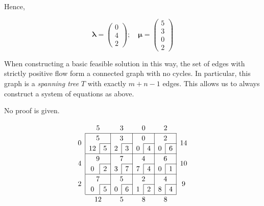 \noindent Hence,

\[
	\bm\lambda = \begin{pmatrix}
		0 \\ 4 \\ 2
	\end{pmatrix};\quad \bm\mu = \begin{pmatrix}
		5 \\3\\0\\2
	\end{pmatrix}
\]

\begin{theorem}
	When constructing a basic feasible solution in this way, the set of edges with strictly positive flow form a connected graph with no cycles.
	In particular, this graph is a \textit{spanning tree} \( T \) with exactly \( m + n - 1 \) edges.
	This allows us to always construct a system of equations as above.
\end{theorem}
\noindent No proof is given.

\[
	\arraycolsep=5pt\def\arraystretch{1.2}
	\begin{array}{c|c|c|c|c|c|c|c|c|c}
		\multicolumn{1}{c}{}   & \multicolumn{2}{c}{5}   & \multicolumn{2}{c}{3}  & \multicolumn{2}{c}{0}  & \multicolumn{2}{c}{2}  & \multicolumn{1}{c}{}                                       \\\cline{2-9}
		\multirow{2}{*}{\(0\)} & \multicolumn{2}{c|}{5}  & \multicolumn{2}{c|}{3} & \multicolumn{2}{c|}{0} & \multicolumn{2}{c|}{2} & \multirow{2}{*}{\(14\)}                                    \\\cline{3-3}\cline{5-5}\cline{7-7}\cline{9-9}
		                       & \multicolumn{1}{c|}{12} & 5                      & \multicolumn{1}{c|}{2} & 3                      & \multicolumn{1}{c|}{0}  & 4 & \multicolumn{1}{c|}{0} & 6 & \\\cline{2-9}
		\multirow{2}{*}{\(4\)} & \multicolumn{2}{c|}{9}  & \multicolumn{2}{c|}{7} & \multicolumn{2}{c|}{4} & \multicolumn{2}{c|}{6} & \multirow{2}{*}{\(10\)}                                    \\\cline{3-3}\cline{5-5}\cline{7-7}\cline{9-9}
		                       & \multicolumn{1}{c|}{0}  & 2                      & \multicolumn{1}{c|}{3} & 7                      & \multicolumn{1}{c|}{7}  & 4 & \multicolumn{1}{c|}{0} & 1 & \\\cline{2-9}
		\multirow{2}{*}{\(2\)} & \multicolumn{2}{c|}{7}  & \multicolumn{2}{c|}{5} & \multicolumn{2}{c|}{2} & \multicolumn{2}{c|}{4} & \multirow{2}{*}{\(9\)}                                     \\\cline{3-3}\cline{5-5}\cline{7-7}\cline{9-9}
		                       & \multicolumn{1}{c|}{0}  & 5                      & \multicolumn{1}{c|}{0} & 6                      & \multicolumn{1}{c|}{1}  & 2 & \multicolumn{1}{c|}{8} & 4 & \\\cline{2-9}
		\multicolumn{1}{c}{}   & \multicolumn{2}{c}{12}  & \multicolumn{2}{c}{5}  & \multicolumn{2}{c}{8}  & \multicolumn{2}{c}{8}  & \multicolumn{1}{c}{}
	\end{array}
\]

